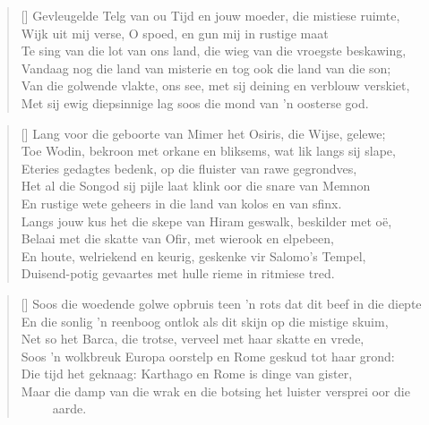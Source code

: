 \settowidth{\versewidth}{Soos die woedende golwe opbruis teen ’n rots dat dit beef in die diepte}
\begin{verse}[\versewidth]
Gevleugelde Telg van ou Tijd en jouw moeder, die mistiese ruimte, \\ 
Wijk uit mij verse, O spoed, en gun mij in rustige maat \\ 
Te sing van die lot van ons land, die wieg van die vroegste beskawing, \\ 
Vandaag nog die land van misterie en tog ook die land van die son; \\ 
Van die golwende vlakte, ons see, met sij deining en verblouw verskiet, \\ 
Met sij ewig diepsinnige lag soos die mond van ’n oosterse god. \\ 
\end{verse}

\begin{verse}[\versewidth]
Lang voor die geboorte van Mimer het Osiris, die Wijse, gelewe; \\ 
Toe Wodin, bekroon met orkane en bliksems, wat lik langs sij slape, \\ 
Eteries gedagtes bedenk, op die fluister van rawe gegrondves, \\ 
Het al die Songod sij pijle laat klink oor die snare van Memnon \\ 
En rustige wete geheers in die land van kolos en van sfinx. \\ 
Langs jouw kus het die skepe van Hiram geswalk, beskilder met o\"e, \\ 
Belaai met die skatte van Ofir, met wierook en elpebeen, \\ 
En houte, welriekend en keurig, geskenke vir Salomo’s Tempel, \\ 
Duisend-potig gevaartes met hulle rieme in ritmiese tred. \\ 
\end{verse}

\begin{verse}[\versewidth]
Soos die woedende golwe opbruis teen ’n rots dat dit beef in die diepte \\ 
En die sonlig ’n reenboog ontlok als dit skijn op die mistige skuim, \\ 
Net so het Barca, die trotse, verveel met haar skatte en vrede, \\ 
Soos ’n wolkbreuk Europa oorstelp en Rome geskud tot haar grond: \\ 
Die tijd het geknaag: Karthago en Rome is dinge van gister, \\ 
Maar die damp van die wrak en die botsing het luister versprei oor die \\ 
\ \ \ \ \ aarde. \\ 
\end{verse}

